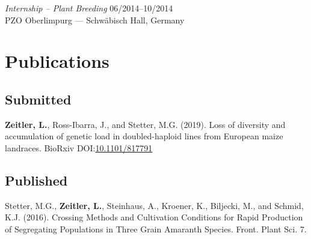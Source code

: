 \documentclass[margin,10pt,a4paper]{res}
\begin{document}
\begin{resume}


{\sl Internship -- Plant Breeding} \hfill 06/2014--10/2014 \\
PZO Oberlimpurg  --- Schwäbisch Hall, Germany


 
\section{Publications} %
\subsection{Submitted}
\begin{etaremune}
\setlength\itemsep{0ex}
\item \textbf{Zeitler, L.}, Ross-Ibarra, J., and Stetter, M.G. (2019). Loss of diversity and accumulation of genetic load in doubled-haploid lines from European maize landraces. BioRxiv DOI:\href{https://doi.org/10.1101/817791}{10.1101/817791}
\end{etaremune}

\subsection{Published}
\begin{etaremune}
\setlength\itemsep{0ex}
\item Stetter, M.G., \textbf{Zeitler, L.}, Steinhaus, A., Kroener, K., Biljecki, M., and Schmid, K.J. (2016). Crossing Methods and Cultivation Conditions for Rapid Production of Segregating Populations in Three Grain Amaranth Species. Front. Plant Sci. 7.
\end{etaremune}



\end{resume}
\end{document}
